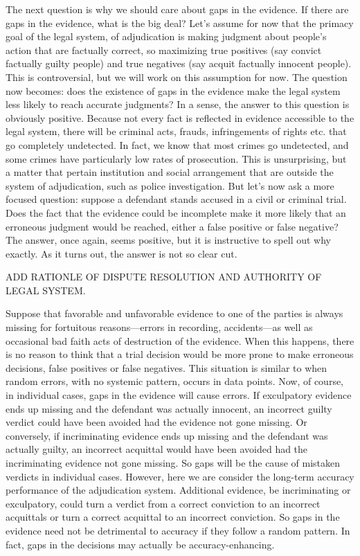 \documentclass[
  10pt,
  dvipsnames,enabledeprecatedfontcommands]{scrartcl}
\begin{document}
The next question is why we should care about gaps in the evidence. If
there are gaps in the evidence, what is the big deal? Let's assume for
now that the primacy goal of the legal system, of adjudication is making
judgment about people's action that are factually correct, so maximizing
true positives (say convict factually guilty people) and true negatives
(say acquit factually innocent people). This is controversial, but we
will work on this assumption for now. The question now becomes: does the
existence of gaps in the evidence make the legal system less likely to
reach accurate judgments? In a sense, the answer to this question is
obviously positive. Because not every fact is reflected in evidence
accessible to the legal system, there will be criminal acts, frauds,
infringements of rights etc. that go completely undetected. In fact, we
know that most crimes go undetected, and some crimes have particularly
low rates of prosecution. This is unsurprising, but a matter that
pertain institution and social arrangement that are outside the system
of adjudication, such as police investigation. But let's now ask a more
focused question: suppose a defendant stands accused in a civil or
criminal trial. Does the fact that the evidence could be incomplete make
it more likely that an erroneous judgment would be reached, either a
false positive or false negative? The answer, once again, seems
positive, but it is instructive to spell out why exactly. As it turns
out, the answer is not so clear cut.

ADD RATIONLE OF DISPUTE RESOLUTION AND AUTHORITY OF LEGAL SYSTEM.

Suppose that favorable and unfavorable evidence to one of the parties is
always missing for fortuitous reasons---errors in recording,
accidents---as well as occasional bad faith acts of destruction of the
evidence. When this happens, there is no reason to think that a trial
decision would be more prone to make erroneous decisions, false
positives or false negatives. This situation is similar to when random
errors, with no systemic pattern, occurs in data points. Now, of course,
in individual cases, gaps in the evidence will cause errors. If
exculpatory evidence ends up missing and the defendant was actually
innocent, an incorrect guilty verdict could have been avoided had the
evidence not gone missing. Or conversely, if incriminating evidence ends
up missing and the defendant was actually guilty, an incorrect acquittal
would have been avoided had the incriminating evidence not gone missing.
So gaps will be the cause of mistaken verdicts in individual cases.
However, here we are consider the long-term accuracy performance of the
adjudication system. Additional evidence, be incriminating or
exculpatory, could turn a verdict from a correct conviction to an
incorrect acquittals or turn a correct acquittal to an incorrect
conviction. So gaps in the evidence need not be detrimental to accuracy
if they follow a random pattern. In fact, gaps in the decisions may
actually be accuracy-enhancing.
\end{document}
